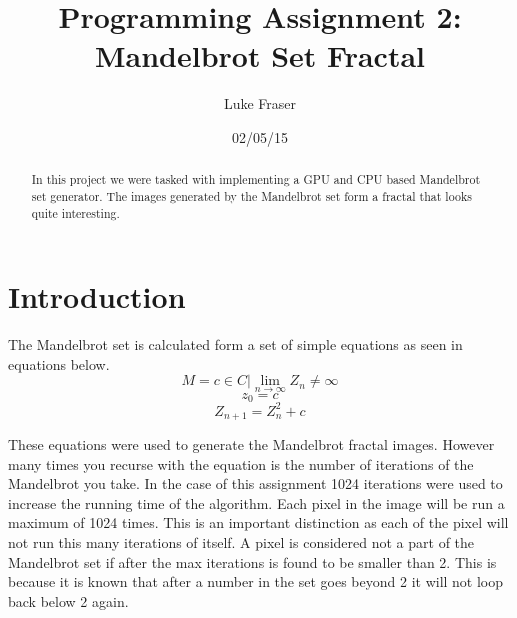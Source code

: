 \documentclass[letterpaper,twocolumn, 11pt]{article}
\author{Luke Fraser}
\title{Programming Assignment 2: \\ Mandelbrot Set Fractal}
\date{02/05/15}
\begin{document}
\maketitle
\begin{abstract}
In this project we were tasked with implementing a GPU and CPU based Mandelbrot set generator. The images generated by the Mandelbrot set form a fractal that looks quite interesting.
\end{abstract}

\section{Introduction}
The Mandelbrot set is calculated form a set of simple equations as seen in equations below.
\begin{equation}
  M={c \in C| \lim_{n \to \infty}Z_n \neq \infty}
\end{equation}
\begin{equation}
  z_0=c
\end{equation}
\begin{equation}
  Z_{n+1}=Z_n^2+c
\end{equation}

These equations were used to generate the Mandelbrot fractal images. However many times you recurse with the equation is the number of iterations of the Mandelbrot you take. In the case of this assignment 1024 iterations were used to increase the running time of the algorithm. Each pixel in the image will be run a maximum of 1024 times. This is an important distinction as each of the pixel will not run this many iterations of itself. A pixel is considered not a part of the Mandelbrot set if after the max iterations is found to be smaller than 2. This is because it is known that after a number in the set goes beyond 2 it will not loop back below 2 again.
\end{document}
